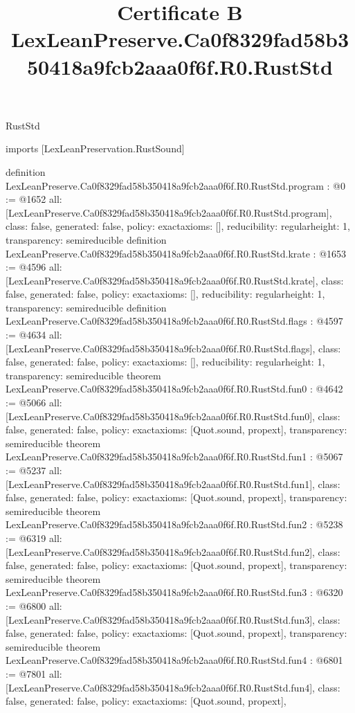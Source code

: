 \begin{lexlean}{RustStd}
\title{Certificate B LexLeanPreserve.Ca0f8329fad58b350418a9fcb2aaa0f6f.R0.RustStd}
\begin{coremodule}
imports [LexLeanPreservation.RustSound]

definition LexLeanPreserve.Ca0f8329fad58b350418a9fcb2aaa0f6f.R0.RustStd.program : @0 := @1652 {
  all: [LexLeanPreserve.Ca0f8329fad58b350418a9fcb2aaa0f6f.R0.RustStd.program],
  class: false,
  generated: false,
  policy: exact{axioms: []},
  reducibility: regular{height: 1},
  transparency: semireducible
}
definition LexLeanPreserve.Ca0f8329fad58b350418a9fcb2aaa0f6f.R0.RustStd.krate : @1653 := @4596 {
  all: [LexLeanPreserve.Ca0f8329fad58b350418a9fcb2aaa0f6f.R0.RustStd.krate],
  class: false,
  generated: false,
  policy: exact{axioms: []},
  reducibility: regular{height: 1},
  transparency: semireducible
}
definition LexLeanPreserve.Ca0f8329fad58b350418a9fcb2aaa0f6f.R0.RustStd.flags : @4597 := @4634 {
  all: [LexLeanPreserve.Ca0f8329fad58b350418a9fcb2aaa0f6f.R0.RustStd.flags],
  class: false,
  generated: false,
  policy: exact{axioms: []},
  reducibility: regular{height: 1},
  transparency: semireducible
}
theorem LexLeanPreserve.Ca0f8329fad58b350418a9fcb2aaa0f6f.R0.RustStd.fun0 : @4642 := @5066 {
  all: [LexLeanPreserve.Ca0f8329fad58b350418a9fcb2aaa0f6f.R0.RustStd.fun0],
  class: false,
  generated: false,
  policy: exact{axioms: [Quot.sound, propext]},
  transparency: semireducible
}
theorem LexLeanPreserve.Ca0f8329fad58b350418a9fcb2aaa0f6f.R0.RustStd.fun1 : @5067 := @5237 {
  all: [LexLeanPreserve.Ca0f8329fad58b350418a9fcb2aaa0f6f.R0.RustStd.fun1],
  class: false,
  generated: false,
  policy: exact{axioms: [Quot.sound, propext]},
  transparency: semireducible
}
theorem LexLeanPreserve.Ca0f8329fad58b350418a9fcb2aaa0f6f.R0.RustStd.fun2 : @5238 := @6319 {
  all: [LexLeanPreserve.Ca0f8329fad58b350418a9fcb2aaa0f6f.R0.RustStd.fun2],
  class: false,
  generated: false,
  policy: exact{axioms: [Quot.sound, propext]},
  transparency: semireducible
}
theorem LexLeanPreserve.Ca0f8329fad58b350418a9fcb2aaa0f6f.R0.RustStd.fun3 : @6320 := @6800 {
  all: [LexLeanPreserve.Ca0f8329fad58b350418a9fcb2aaa0f6f.R0.RustStd.fun3],
  class: false,
  generated: false,
  policy: exact{axioms: [Quot.sound, propext]},
  transparency: semireducible
}
theorem LexLeanPreserve.Ca0f8329fad58b350418a9fcb2aaa0f6f.R0.RustStd.fun4 : @6801 := @7801 {
  all: [LexLeanPreserve.Ca0f8329fad58b350418a9fcb2aaa0f6f.R0.RustStd.fun4],
  class: false,
  generated: false,
  policy: exact{axioms: [Quot.sound, propext]},
}
\end{coremodule}
\end{lexlean}
